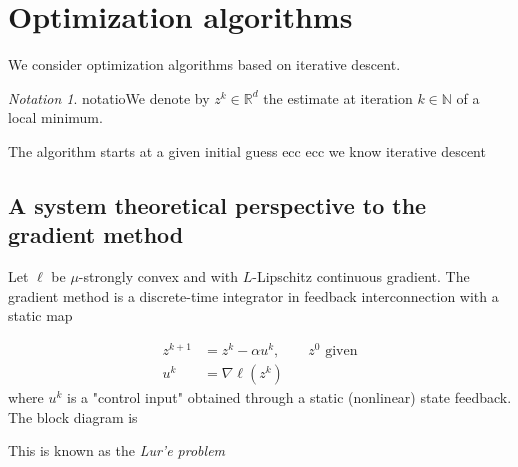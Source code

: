 \documentclass{book}
\newcommand{\R}{\mathbb{R}}
\newcommand{\N}{\mathbb{N}}
\theoremstyle{theoremv2}
\theoremstyle{defv2}
\theoremstyle{remark}
\theoremstyle{remark}
\newtheorem*{notation}{Notation}
\theoremstyle{definition}
\theoremstyle{definition}
\begin{document}
\section{Optimization algorithms}
We consider optimization algorithms based on iterative descent.
\begin{notation}
    notatioWe denote by $z^k\in\R^d$ the estimate at iteration $k\in\N$ of a local minimum. 
\end{notation}
The algorithm starts at a given initial guess ecc ecc we know iterative descent
\subsection{A system theoretical perspective to the gradient method}
Let $\ell$ be $\mu$-strongly convex and with $L$-Lipschitz continuous gradient. The gradient method is a discrete-time integrator in feedback interconnection with a static map

\begin{align*}
    z^{k+1} &= z^k-\alpha u^k, \qquad  z^0 \text{ given}\\ 
    u^k &= \nabla \ell(z^k)
\end{align*}
where $u^k$ is a "control input" obtained through a static (nonlinear) state feedback. The block diagram is 

This is known as the \emph{Lur'e problem}
\end{document}
